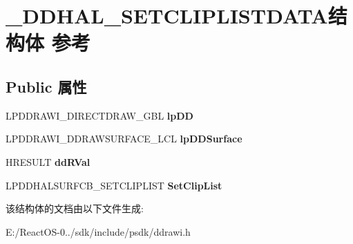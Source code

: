 \hypertarget{struct___d_d_h_a_l___s_e_t_c_l_i_p_l_i_s_t_d_a_t_a}{}\section{\+\_\+\+D\+D\+H\+A\+L\+\_\+\+S\+E\+T\+C\+L\+I\+P\+L\+I\+S\+T\+D\+A\+T\+A结构体 参考}
\label{struct___d_d_h_a_l___s_e_t_c_l_i_p_l_i_s_t_d_a_t_a}
\subsection*{Public 属性}
\begin{DoxyCompactItemize}
\item 
\mbox{\label{struct___d_d_h_a_l___s_e_t_c_l_i_p_l_i_s_t_d_a_t_a_af28a28351f712f420cabb68722ee022a}} 
L\+P\+D\+D\+R\+A\+W\+I\+\_\+\+D\+I\+R\+E\+C\+T\+D\+R\+A\+W\+\_\+\+G\+BL {\bfseries lp\+DD}
\item 
\mbox{\label{struct___d_d_h_a_l___s_e_t_c_l_i_p_l_i_s_t_d_a_t_a_ae5253a90c309c08b67db598ee56f824d}} 
L\+P\+D\+D\+R\+A\+W\+I\+\_\+\+D\+D\+R\+A\+W\+S\+U\+R\+F\+A\+C\+E\+\_\+\+L\+CL {\bfseries lp\+D\+D\+Surface}
\item 
\mbox{\label{struct___d_d_h_a_l___s_e_t_c_l_i_p_l_i_s_t_d_a_t_a_a9cf782873b2241b4e6f5c6839cec1fce}} 
H\+R\+E\+S\+U\+LT {\bfseries dd\+R\+Val}
\item 
\mbox{\label{struct___d_d_h_a_l___s_e_t_c_l_i_p_l_i_s_t_d_a_t_a_a9763801342878a69a4c63fb965eeb0a3}} 
L\+P\+D\+D\+H\+A\+L\+S\+U\+R\+F\+C\+B\+\_\+\+S\+E\+T\+C\+L\+I\+P\+L\+I\+ST {\bfseries Set\+Clip\+List}
\end{DoxyCompactItemize}


该结构体的文档由以下文件生成\+:\begin{DoxyCompactItemize}
\item 
E\+:/\+React\+O\+S-\/0../sdk/include/psdk/ddrawi.\+h\end{DoxyCompactItemize}
